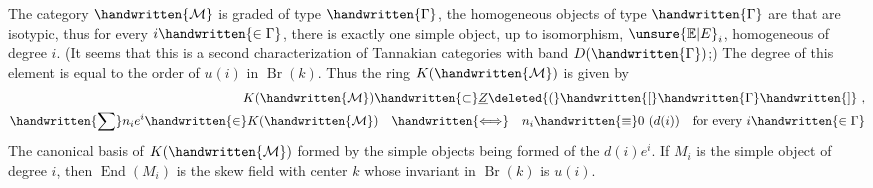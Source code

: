  The category $\handwritten{\mathcal{M}}$ is graded of type $\handwritten{\Gamma}$, the homogeneous objects of type $\handwritten{\Gamma}$ are that are isotypic, thus for every $i\handwritten{\in\Gamma}$, there is exactly one simple object, up to isomorphism, $\unsure{\mathbb{E}|E}_i$,  homogeneous of degree $i$. (It seems that this is a second characterization of Tannakian categories with band $D(\handwritten{\Gamma})$;) The degree of this element is equal to the order of $u(i)$ in $\operatorname{Br}(k)$. Thus the ring $K(\handwritten{\mathcal{M}})$ is given by
\[
\begin{aligned}
K(\handwritten{\mathcal{M}})\handwritten{\subset}\underline{Z}\deleted{(}\handwritten{[}\handwritten{\Gamma}\handwritten{]}\ ,\\
\handwritten{\sum}n_i e^i\handwritten{\in}K(\handwritten{\mathcal{M}})\quad\handwritten{\Longleftrightarrow}\quad n_i\handwritten{\equiv}0\ (d(i))\quad\text{for every }i\handwritten{\in\Gamma}
\end{aligned}
\]
The canonical basis of $K(\handwritten{\mathcal{M}})$ formed by the simple objects being formed of the $d(i)e^i$. If $M_i$ is the simple object of  degree $i$, then $\operatorname{End}(M_i)$ is the skew field  with center $k$ whose invariant in $\operatorname{Br}(k)$ is $u(i)$.


